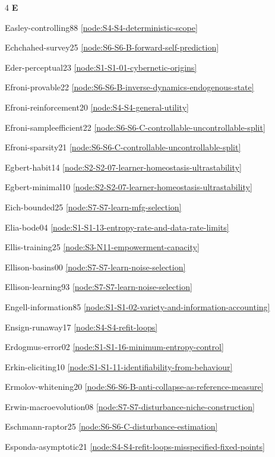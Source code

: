 \documentclass[10pt]{article}
\begin{document}
{\begin{multicols}{4}
\smallskip\textbf{E}\par
Easley-controlling88 \hfill \ref{node:S4-S4-deterministic-scope}\par
Echchahed-survey25 \hfill \ref{node:S6-S6-B-forward-self-prediction}\par
Eder-perceptual23 \hfill \ref{node:S1-S1-01-cybernetic-origins}\par
Efroni-provable22 \hfill \ref{node:S6-S6-B-inverse-dynamics-endogenous-state}\par
Efroni-reinforcement20 \hfill \ref{node:S4-S4-general-utility}\par
Efroni-sampleefficient22 \hfill \ref{node:S6-S6-C-controllable-uncontrollable-split}\par
Efroni-sparsity21 \hfill \ref{node:S6-S6-C-controllable-uncontrollable-split}\par
Egbert-habit14 \hfill \ref{node:S2-S2-07-learner-homeostasis-ultrastability}\par
Egbert-minimal10 \hfill \ref{node:S2-S2-07-learner-homeostasis-ultrastability}\par
Eich-bounded25 \hfill \ref{node:S7-S7-learn-mfg-selection}\par
Elia-bode04 \hfill \ref{node:S1-S1-13-entropy-rate-and-data-rate-limits}\par
Ellis-training25 \hfill \ref{node:S3-N11-empowerment-capacity}\par
Ellison-basins00 \hfill \ref{node:S7-S7-learn-noise-selection}\par
Ellison-learning93 \hfill \ref{node:S7-S7-learn-noise-selection}\par
Engell-information85 \hfill \ref{node:S1-S1-02-variety-and-information-accounting}\par
Ensign-runaway17 \hfill \ref{node:S4-S4-refit-loops}\par
Erdogmus-error02 \hfill \ref{node:S1-S1-16-minimum-entropy-control}\par
Erkin-eliciting10 \hfill \ref{node:S1-S1-11-identifiability-from-behaviour}\par
Ermolov-whitening20 \hfill \ref{node:S6-S6-B-anti-collapse-as-reference-measure}\par
Erwin-macroevolution08 \hfill \ref{node:S7-S7-disturbance-niche-construction}\par
Eschmann-raptor25 \hfill \ref{node:S6-S6-C-disturbance-estimation}\par
Esponda-asymptotic21 \hfill \ref{node:S4-S4-refit-loops-misspecified-fixed-points}\par

\end{multicols}}
\end{document}
